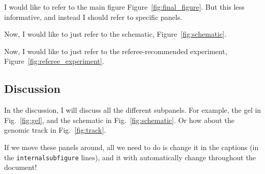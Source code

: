 \documentclass[onecolumn,11pt]{article}
\begin{document}
I would like to refer to the main figure Figure~\ref{fig:final_figure}. But this less informative, and instead I should refer to specific panels.

Now, I would like to just refer to the schematic, Figure~\ref{fig:schematic}.

Now, I would like to just refer to the referee-recommended experiment, Figure~\ref{fig:referee_experiment}.


\clearpage

\subsection*{Discussion}

In the discussion, I will discuss all the different subpanels.
For example, the gel in Fig.~\ref{fig:gel}, and the schematic in Fig.~\ref{fig:schematic}.
Or how about the genomic track in Fig.~\ref{fig:track}.


If we move these panels around, all we need to do is change it in the captions (in the \verb|internalsubfigure| lines), and it with automatically change throughout the document! 
\end{document}

